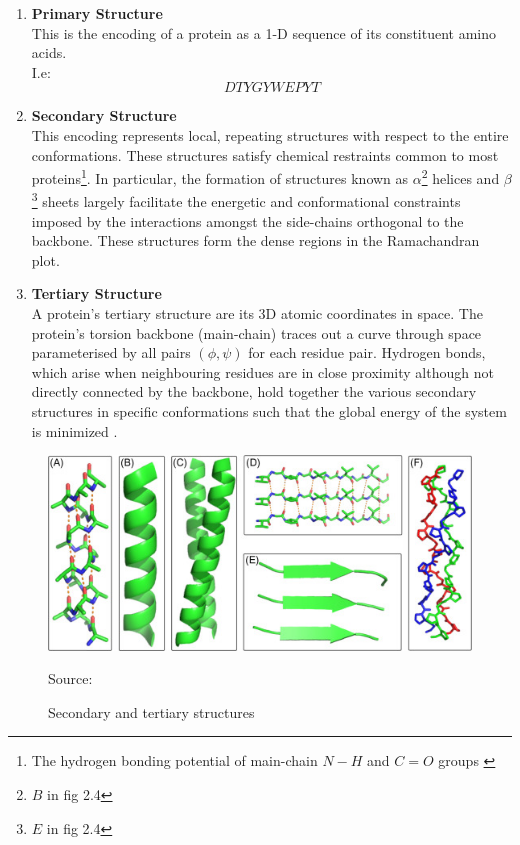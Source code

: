 \begin{enumerate}
    \item \textbf{Primary Structure} \\
        This is the encoding of a protein as a 1-D sequence
        of its constituent amino acids. \\I.e:
        \[DTYGYWEPYT\]
    \item \textbf{Secondary Structure} \\
        This encoding represents local, repeating structures
        with respect to the entire conformations. These
        structures satisfy chemical restraints common to most proteins\footnote{The hydrogen bonding potential of main-chain $N-H$ and $C=O$ groups \cite{lesk}}.
        In particular, the formation of structures known as $\alpha$\footnote{$B$ in fig 2.4} helices
        and $\beta$\footnote{$E$ in fig 2.4} sheets largely facilitate the energetic 
        and conformational constraints imposed by the interactions
        amongst the side-chains orthogonal to the backbone. These
        structures form the dense regions in the Ramachandran plot.
    \item \textbf{Tertiary Structure} \\
        A protein's tertiary structure are its 3D atomic
        coordinates in space. The protein's torsion backbone
        (main-chain) traces out a curve through space parameterised
        by all pairs $(\phi, \psi)$ for each residue pair. Hydrogen bonds, which arise when neighbouring residues are in close
        proximity although not directly connected by the backbone, hold together the various secondary structures in specific
        conformations such that the global energy of the system is 
        minimized \cite{Yang}.
\end{enumerate}
\begin{figure}[!htb]
    \caption{Secondary and tertiary structures}
    \begin{center}
        \includegraphics[scale=0.8]{Figures/Structures}
    \end{center}
    \scriptsize{\dag Source: \cite{Boyle}}
 \end{figure}

